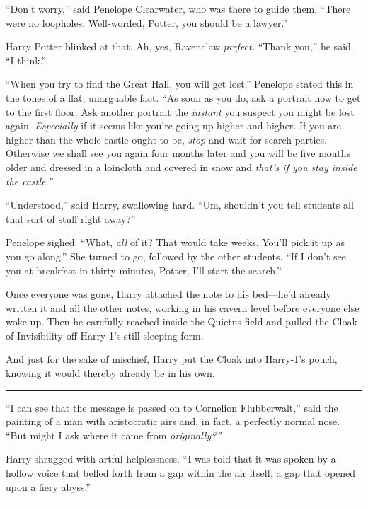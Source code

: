 ``Don't worry,'' said Penelope Clearwater, who was there to guide them.
``There were no loopholes. Well-worded, Potter, you should be a
lawyer.''

Harry Potter blinked at that. Ah, yes, Ravenclaw \emph{prefect.} ``Thank
you,'' he said. ``I think.''

``When you try to find the Great Hall, you will get lost.'' Penelope
stated this in the tones of a flat, unarguable fact. ``As soon as you
do, ask a portrait how to get to the first floor. Ask another portrait
the \emph{instant} you suspect you might be lost again.
\emph{Especially} if it seems like you're going up higher and higher. If
you are higher than the whole castle ought to be, \emph{stop} and wait
for search parties. Otherwise we shall see you again four months later
and you will be five months older and dressed in a loincloth and covered
in snow and \emph{that's if you stay inside the castle.''}

``Understood,'' said Harry, swallowing hard. ``Um, shouldn't you tell
students all that sort of stuff right away?''

Penelope sighed. ``What, \emph{all} of it? That would take weeks. You'll
pick it up as you go along.'' She turned to go, followed by the other
students. ``If I don't see you at breakfast in thirty minutes, Potter,
I'll start the search.''

Once everyone was gone, Harry attached the note to his bed---he'd
already written it and all the other notes, working in his cavern level
before everyone else woke up. Then he carefully reached inside the
Quietus field and pulled the Cloak of Invisibility off Harry-1's
still-sleeping form.

And just for the sake of mischief, Harry put the Cloak into Harry-1's
pouch, knowing it would thereby already be in his own.

\begin{center}\rule{3in}{0.4pt}\end{center}

``I can see that the message is passed on to Cornelion Flubberwalt,''
said the painting of a man with aristocratic airs and, in fact, a
perfectly normal nose. ``But might I ask where it came from
\emph{originally?''}

Harry shrugged with artful helplessness. ``I was told that it was spoken
by a hollow voice that belled forth from a gap within the air itself, a
gap that opened upon a fiery abyss.''

\begin{center}\rule{3in}{0.4pt}\end{center}

